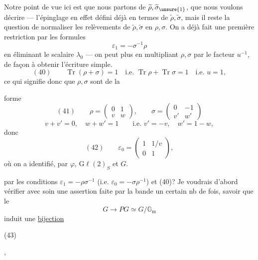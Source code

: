 
Notre point de vue ici est que nous partons de $\widetilde\rho,\widetilde\sigma_{\unsure{1}}$, que nous voulons décrire --- l'épinglage  en effet défini déjà en termes de $\widetilde\rho,\widetilde\sigma$, mais il reste la question de normaliser les relèvements de $\widetilde\rho,\widetilde\sigma$ en $\rho,\sigma$. On a déjà fait une première restriction par les formules
\[
\varepsilon_1=-\sigma^{-1}\rho
\]
en éliminant le  scalaire $\lambda_0$ --- on peut  plus en multipliant $\rho,\sigma$ par le facteur $u^{-1}$, de façon à obtenir l'écriture simple.
\[
(40)\qquad\operatorname{Tr}(\rho+\sigma)=1\quad\text{i.e. }\operatorname{Tr}\rho+\operatorname{Tr}\sigma=1\quad\text{i.e. }u=1,
\]
ce qui signifie donc que $\rho,\sigma$ sont de la



forme
\[
(41)\qquad \rho=\begin{pmatrix}0&1\\v&w\end{pmatrix},\qquad
\sigma=\begin{pmatrix}0&-1\\v'&w'\end{pmatrix}
\]
\[
v+v'=0,\quad w+w'=1\qquad\text{i.e. }v'=-v,\quad w'=1-w,
\]
donc
\[
(42)\qquad\varepsilon_0=\begin{pmatrix}1&1/v\\0&1\end{pmatrix},
\]
où on a identifié, par $\varphi$, $\mathrm{G}\ell(2)_S$ et $G$.

 par les conditions $\varepsilon_1=-\rho\sigma^{-1}$ (i.e. $\varepsilon_0=-\sigma\rho^{-1}$) et (40)?
Je voudrais d'abord vérifier avec soin une assertion faite par la bande un certain nb de fois, savoir que le  
\[
G\longrightarrow PG\simeq G/\mathbb G_{\mathrm m}
\]
induit une \uline{bijection}

\begin{samepage}
(43)\quad
{}
\end{samepage},


